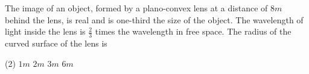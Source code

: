 
\item The image of an object, formed by a plano-convex lens at a distance of \(8 m\) behind the lens, is real and is one-third the size of the object. The wavelength of light inside the lens is \(\frac{2}{3}\) times the wavelength in free space. The radius of the curved surface of the lens is
    \begin{tasks}(2)
        \task \(1 m\)
        \task \(2 m\)
        \task \(3 m\)
        \task \(6 m\)
    \end{tasks}
